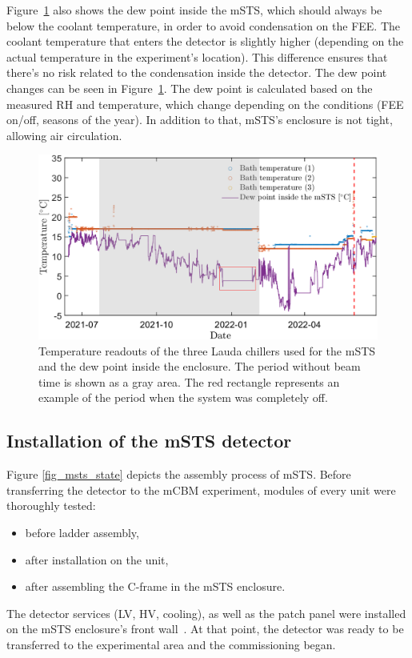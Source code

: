 Figure~\ref{fig_cooling} also shows the dew point inside the \gls{mSTS}, which should always be below the coolant temperature, in order to avoid condensation on the \gls{FEE}. The coolant temperature that enters the detector is slightly higher (depending on the actual temperature in the experiment's location). This difference ensures that there's no risk related to the condensation inside the detector. The dew point changes can be seen in Figure~\ref{fig_cooling}. The dew point is calculated based on the measured \gls{RH} and temperature, which change depending on the conditions (\gls{FEE} on/off, seasons of the year). In addition to that, \gls{mSTS}'s enclosure is not tight,  allowing air circulation.
\begin{figure}[!h]
\centering
\includegraphics[width=0.95\columnwidth]{Chapter6/DCS/images/cooling.png}
\caption{Temperature readouts of the three Lauda chillers used for the \gls{mSTS} and the dew point inside the enclosure. The period without beam time is shown as a gray area. The red rectangle represents an example of the period when the system was completely off.}
\label{fig_cooling}
\end{figure}

\subsection{Installation of the mSTS detector}
Figure \ref{fig_msts_state} depicts the assembly process of \gls{mSTS}. Before transferring the detector to the \gls{mCBM} experiment, modules of every unit were thoroughly tested:
\begin{itemize}
    \item before ladder assembly,
    \item after installation on the unit,
    \item after assembling the C-frame in the mSTS enclosure.
\end{itemize}
The detector services (\gls{LV}, \gls{HV}, cooling), as well as the patch panel were installed on the \gls{mSTS} enclosure's front wall~\cite{tekli1}. At that point, the detector was ready to be transferred to the experimental area and the commissioning began.

